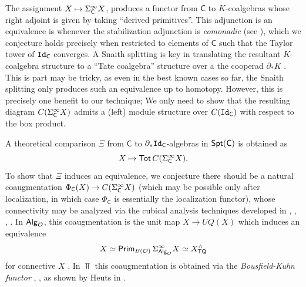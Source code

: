 The assignment $X\mapsto \Sigma^{\infty}_{\mathsf{C}} X$, produces a functor from $\mathsf{C}$ to $K$-coalgebras whose right adjoint is given by taking ``derived primitives''. This adjunction is an equivalence is whenever the stabilization adjunction is \textit{comonadic} (see \cite{Hess}), which we conjecture holds precisely when restricted to elements of $\mathsf{C}$ such that the Taylor tower of $\mathtt{Id}_{\mathsf{C}}$ converges. A Snaith splitting is key in translating the resultant $K$-coalgebra structure to a ``Tate coalgebra'' structure over a the cooperad $\partial_*K$ \cite{Heuts-thesis}. This is part may be tricky, as even in the best known cases so far, the Snaith splitting only produces such an equivalence up to homotopy. However, this is precisely one benefit to our technique; %
We only need to show that the resulting diagram $C(\Sigma^{\infty}_{\mathsf{C}} X)$ admits a (left) module structure over $C(\mathtt{Id}_{\mathsf{C}})$ with respect to the box product. 

A theoretical comparison $\Xi$ from $\mathsf{C}$ to $\partial_*\mathtt{Id}_{\mathsf{C}}$-algebras in $\mathsf{Spt}(\mathsf{C})$ is  obtained as \[X\mapsto \operatorname{\mathsf{Tot}} C(\Sigma^{\infty}_{\mathsf{C}}X).\] To show that $\Xi$ induces an equivalence, we conjecture there should be a natural coaugmentation $\Phi_{\mathsf{C}}(X)\to C(\Sigma^{\infty}_{\mathsf{C}}X)$ (which may be possible only after localization, in which case $\Phi_{\mathsf{C}}$ is essentially the localization functor), whose connectivity may be analyzed via the cubical analysis techniques developed in \cite{Dundas-1}, \cite{Blom}, \cite{BH}, \cite{Ching-Harper-BM}. In ${\mathsf{Alg}_{\mathcal{O}}}$, this coaugmentation is the unit map $X\to UQ(X)$ which induces an equivalence \[X \simeq \operatorname{\mathsf{Prim}}_{B(\mathcal{O})}\Sigma^{\infty}_{{\mathsf{Alg}_{\mathcal{O}}}}X\simeq X^{\wedge}_{\mathsf{TQ}}\] for connective $X$ \cite{Clark-1}. In $\Top$ this coaugmentation is obtained via the \textit{Bousfield-Kuhn functor} \cite{Kuh-BK-functor}, \cite{Bou-BK-functor}, as shown by Heuts in  \cite{Heuts-vn}. 



